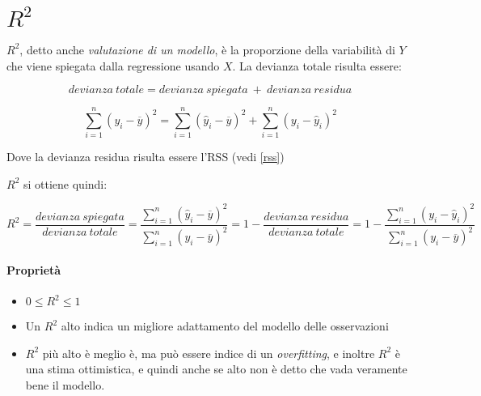 \section{$R^2$}

$R^2$, detto anche \textit{valutazione di un modello}, \`e la proporzione della 
variabilit\`a di $Y$ che viene spiegata dalla regressione usando $X$.
La devianza totale risulta essere:

\[ devianza\ totale = devianza\ spiegata\ +\ devianza\ residua\]

\[ \sum_{i=1}^n (y_i - \overline{y})^2 = \sum_{i=1}^n (\hat{y}_i - 
\overline{y})^2 + \sum_{i=1}^n (y_i - \hat{y}_i)^2 \]

Dove la devianza residua risulta essere l'RSS (vedi \ref{rss})

$R^2$ si ottiene quindi:

\[ R^2 = \frac{devianza\ spiegata}{devianza\ totale} = \frac{\sum_{i=1}^n 
(\hat{y}_i - \overline{y})^2}{\sum_{i=1}^n (y_i - \overline{y})^2} = 1 - 
\frac{devianza\ residua}{devianza\ totale} = 1 - \frac{\sum_{i=1}^n (y_i - 
\hat{y}_i)^2}{\sum_{i=1}^n (y_i - \overline{y})^2} \]

\paragraph*{Propriet\`a}
\begin{itemize}
 \item $0 \le R^2 \le 1$
 \item Un $R^2$ alto indica un migliore adattamento del modello delle 
osservazioni
 \item $R^2$ pi\`u alto \`e meglio \`e, ma pu\`o essere indice di un
\textit{overfitting}, e inoltre $R^2$ \`e una stima ottimistica, e quindi anche 
se alto non \`e detto che vada veramente bene il modello.
\end{itemize}
